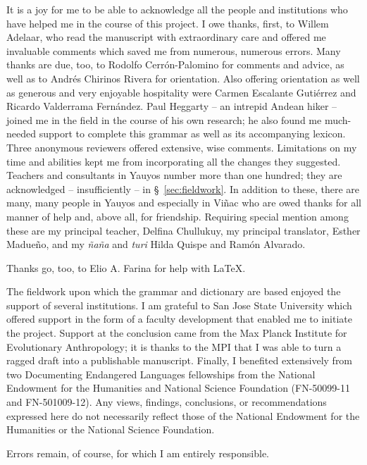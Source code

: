 \begin{refsection}
It is a joy for me to be able to acknowledge all the people and institutions who have helped me in the course of this project. I owe thanks, first, to Willem Adelaar, who read the manuscript with extraordinary care and offered me invaluable comments which saved me from numerous, numerous errors. Many thanks are due, too, to Rodolfo Cerr\'on-Palomino for comments and advice, as well as to Andr\'es Chirinos Rivera for orientation. Also offering orientation as well as generous and very enjoyable hospitality were Carmen Escalante Guti\'errez and Ricardo Valderrama Fern\'andez. Paul Heggarty -- an intrepid Andean hiker -- joined me in the field in the course of his own research; he also found me much-needed support to complete this grammar as well as its accompanying lexicon. Three anonymous reviewers offered extensive, wise comments. Limitations on my time and abilities kept me from incorporating all the changes they suggested. Teachers and consultants in Yauyos number more than one hundred; they are acknowledged -- insufficiently -- in \S~\ref{sec:fieldwork}. In addition to these, there are many, many people in Yauyos and especially in Vi\~nac who are owed thanks for all manner of help and, above all, for friendship. Requiring special mention among these are my principal teacher, Delfina Chullukuy, my principal translator, Esther Madue\~no, and my \textit{\~na\~na} and \textit{turi} Hilda Quispe and Ram\'on Alvarado.

Thanks go, too, to Elio A. Farina for help with \LaTeX.

The fieldwork upon which the grammar and dictionary are based enjoyed the support of several institutions. I am grateful to San Jose State University which offered support in the form of a faculty development that enabled me to initiate the project. Support at the conclusion came from the Max Planck Institute for Evolutionary Anthropology; it is thanks to the MPI that I was able to turn a ragged draft into a publishable manuscript. Finally, I benefited extensively from two Documenting Endangered Languages fellowships from the National Endowment for the Humanities and National Science Foundation (FN-50099-11 and FN-501009-12). Any views, findings, conclusions, or recommendations expressed here do not necessarily reflect those of the National Endowment for the Humanities or the National Science Foundation.

Errors remain, of course, for which I am entirely responsible.
\printbibliography[heading=subbibliography]
\end{refsection}
